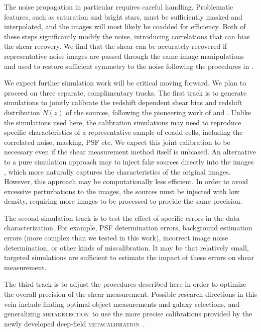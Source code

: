 \documentclass[twocolumn,twocolappendix,astrosym]{openjournal}
\newcommand{\mcal}{\textsc{metacalibration}}
\newcommand{\mdet}{\textsc{metadetection}}
\begin{document}
The noise propagation in particular requires careful handling.  Problematic
features, such as saturation and bright stars, must be sufficiently masked and
interpolated, and the images will most likely be coadded for efficiency. Both
of these steps significantly modify the noise, introducing correlations that
can bias the shear recovery.  We find that
the shear can be accurately recovered if representative noise images are passed
through the same image manipulations and used to restore sufficient symmetry to
the noise following the procedures in \cite{SheldonMcal2017,BeckerMdetCoadd}.

We expect further simulation work will be critical moving forward.  We plan to
proceed on three separate, complimentary tracks.  The first track is to generate simulations to
jointly calibrate the redshift dependent shear bias and redshift distribution
$N(z)$ of the sources, following the pioneering work of \cite{MacCrann2022} and
\cite{LiNofz2022}.  Unlike the simulations used here, the calibration
simulations may need to reproduce specific characteristics of a representative
sample of coadd cells, including the correlated noise, masking, PSF etc.  We
expect this joint calibration to be necessary even if the shear measurement
method itself is unbiased.  An alternative to a pure simulation approach may to
inject fake sources directly into the images
\citep{SuchytaBalrog2016,EverettBalrog2022}, which more naturally captures the
characteristics of the original images. However, this approach may be computationally
less efficient. In order to avoid excessive perturbations to the images,
the sources must be injected with low density, requiring
more images to be processed to provide the same precision.

The second simulation track is to test the effect of specific errors in the
data characterization.  For example, PSF determination errors, background
estimation errors (more complex than we tested in this work), incorrect image
noise determination, or other kinds of miscalibration.  It may be that
relatively small, targeted simulations are sufficient to estimate the impact of
these errors on shear measurement.

The third track is to adjust the procedures described here in order to optimize
the overall precision of the shear measurement. Possible research directions in
this vein include finding optimal object measurements and galaxy selections,
and generalizing \mdet\ to use the more precise calibrations
provided by the newly developed deep-field \mcal\ \citep{dfmcal22}.
\end{document}
